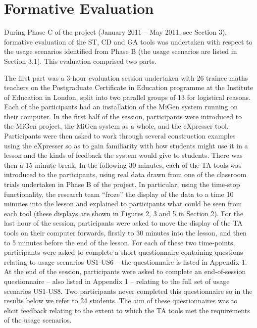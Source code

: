 
\section{Formative Evaluation}
\label{sec:formative-evaluation}

During Phase C of the project (January 2011 – May 2011, see Section
3), formative evaluation of the ST, CD and GA tools was undertaken
with respect to the usage scenarios identified from Phase B (the usage
scenarios are listed in Section 3.1). This evaluation comprised two
parts.

The first part was a 3-hour evaluation session undertaken with 26
trainee maths teachers on the Postgraduate Certificate in Education
programme at the Institute of Education in London, split into two
parallel groups of 13 for logistical reasons. Each of the participants
had an installation of the MiGen system running on their computer. In
the first half of the session, participants were introduced to the
MiGen project, the MiGen system as a whole, and the eXpresser
tool. Participants were then asked to work through several
construction examples using the eXpresser so as to gain familiarity
with how students might use it in a lesson and the kinds of feedback
the system would give to students. There was then a 15 minute
break. In the following 30 minutes, each of the TA tools was
introduced to the participants, using real data drawn from one of the
classroom trials undertaken in Phase B of the project. In particular,
using the time-stop functionality, the research team “froze” the
display of the data to a time 10 minutes into the lesson and explained
to participants what could be seen from each tool (these displays are
shown in Figures 2, 3 and 5 in Section 2). For the last hour of the
session, participants were asked to move the display of the TA tools
on their computer forwards, firstly to 30 minutes into the lesson, and
then to 5 minutes before the end of the lesson. For each of these two
time-points, participants were asked to complete a short questionnaire
containing questions relating to usage scenarios US1-US6 – the
questionnaire is listed in Appendix 1. At the end of the session,
participants were asked to complete an end-of-session questionnaire –
also listed in Appendix 1 – relating to the full set of usage
scenarios US1-US8. Two participants never completed this questionnaire
so in the results below we refer to 24 students. The aim of these
questionnaires was to elicit feedback relating to the extent to which
the TA tools met the requirements of the usage scenarios.   
 
